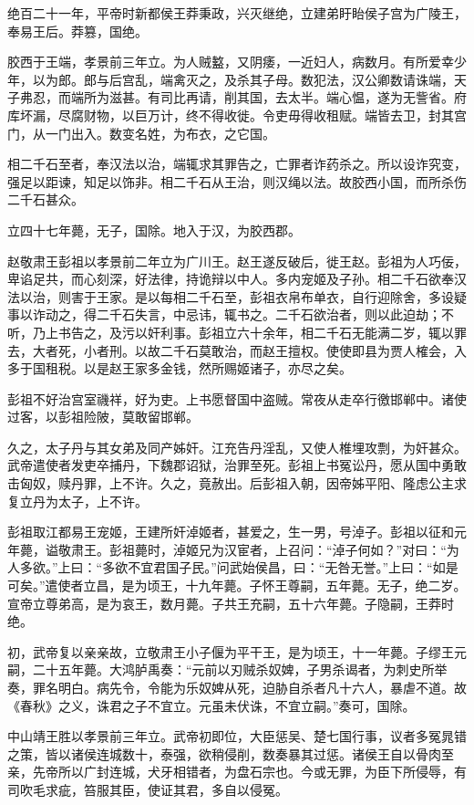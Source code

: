 \documentclass[]{article}
\begin{document}
绝百二十一年，平帝时新都侯王莽秉政，兴灭继绝，立建弟盱眙侯子宫为广陵王，奉易王后。莽篡，国绝。

胶西于王端，孝景前三年立。为人贼盭，又阴痿，一近妇人，病数月。有所爱幸少年，以为郎。郎与后宫乱，端禽灭之，及杀其子母。数犯法，汉公卿数请诛端，天子弗忍，而端所为滋甚。有司比再请，削其国，去太半。端心愠，遂为无訾省。府库坏漏，尽腐财物，以巨万计，终不得收徙。令吏毋得收租赋。端皆去卫，封其宫门，从一门出入。数变名姓，为布衣，之它国。

相二千石至者，奉汉法以治，端辄求其罪告之，亡罪者诈药杀之。所以设诈究变，强足以距谏，知足以饰非。相二千石从王治，则汉绳以法。故胶西小国，而所杀伤二千石甚众。

立四十七年薨，无子，国除。地入于汉，为胶西郡。

赵敬肃王彭祖以孝景前二年立为广川王。赵王遂反破后，徙王赵。彭祖为人巧佞，卑谄足共，而心刻深，好法律，持诡辩以中人。多内宠姬及子孙。相二千石欲奉汉法以治，则害于王家。是以每相二千石至，彭祖衣帛布单衣，自行迎除舍，多设疑事以诈动之，得二千石失言，中忌讳，辄书之。二千石欲治者，则以此迫劫；不听，乃上书告之，及污以奸利事。彭祖立六十余年，相二千石无能满二岁，辄以罪去，大者死，小者刑。以故二千石莫敢治，而赵王擅权。使使即县为贾人榷会，入多于国租税。以是赵王家多金钱，然所赐姬诸子，亦尽之矣。

彭祖不好治宫室禨祥，好为吏。上书愿督国中盗贼。常夜从走卒行徼邯郸中。诸使过客，以彭祖险陂，莫敢留邯郸。

久之，太子丹与其女弟及同产姊奸。江充告丹淫乱，又使人椎埋攻剽，为奸甚众。武帝遣使者发吏卒捕丹，下魏郡诏狱，治罪至死。彭祖上书冤讼丹，愿从国中勇敢击匈奴，赎丹罪，上不许。久之，竟赦出。后彭祖入朝，因帝姊平阳、隆虑公主求复立丹为太子，上不许。

彭祖取江都易王宠姬，王建所奸淖姬者，甚爱之，生一男，号淖子。彭祖以征和元年薨，谥敬肃王。彭祖薨时，淖姬兄为汉宦者，上召问：``淖子何如？''对曰：``为人多欲。''上曰：``多欲不宜君国子民。''问武始侯昌，曰：``无咎无誉。''上曰：``如是可矣。''遣使者立昌，是为顷王，十九年薨。子怀王尊嗣，五年薨。无子，绝二岁。宣帝立尊弟高，是为哀王，数月薨。子共王充嗣，五十六年薨。子隐嗣，王莽时绝。

初，武帝复以亲亲故，立敬肃王小子偃为平干王，是为顷王，十一年薨。子缪王元嗣，二十五年薨。大鸿胪禹奏：``元前以刃贼杀奴婢，子男杀谒者，为刺史所举奏，罪名明白。病先令，令能为乐奴婢从死，迫胁自杀者凡十六人，暴虐不道。故《春秋》之义，诛君之子不宜立。元虽未伏诛，不宜立嗣。''奏可，国除。

中山靖王胜以孝景前三年立。武帝初即位，大臣惩吴、楚七国行事，议者多冤晁错之策，皆以诸侯连城数十，泰强，欲稍侵削，数奏暴其过惩。诸侯王自以骨肉至亲，先帝所以广封连城，犬牙相错者，为盘石宗也。今或无罪，为臣下所侵辱，有司吹毛求疵，笞服其臣，使证其君，多自以侵冤。
\end{document}
